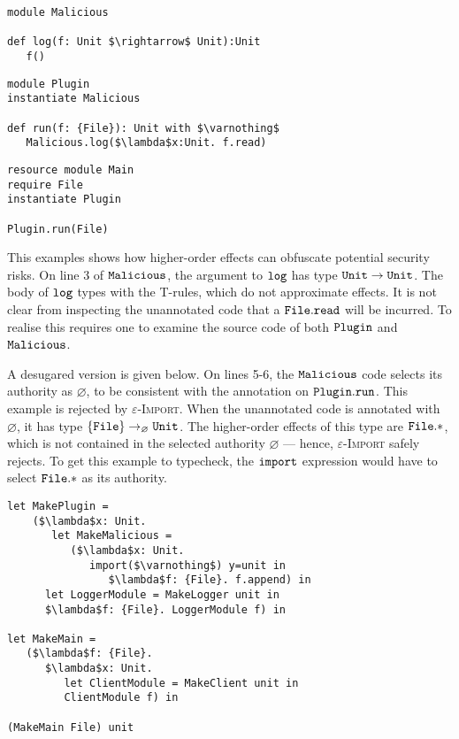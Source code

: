 \begin{lstlisting}
module Malicious

def log(f: Unit $\rightarrow$ Unit):Unit
   f()
\end{lstlisting}

\begin{lstlisting}
module Plugin
instantiate Malicious

def run(f: {File}): Unit with $\varnothing$
   Malicious.log($\lambda$x:Unit. f.read)
\end{lstlisting}

\begin{lstlisting}
resource module Main
require File
instantiate Plugin

Plugin.run(File)
\end{lstlisting}

This examples shows how higher-order effects can obfuscate potential security risks. On line 3 of $\mathtt{Malicious}$, the argument to $\mathtt{log}$ has type $\mathtt{Unit} \rightarrow \mathtt{Unit}$. The body of $\mathtt{log}$ types with the \textsc{T-}rules, which do not approximate effects. It is not clear from inspecting the unannotated code that a $\mathtt{File.read}$ will be incurred. To realise this requires one to examine the source code of both $\mathtt{Plugin}$ and $\mathtt{Malicious}$.

A desugared version is given below. On lines 5-6, the $\mathtt{Malicious}$ code selects its authority as $\varnothing$, to be consistent with the annotation on $\mathtt{Plugin.run}$. This example is rejected by \textsc{$\varepsilon$-Import}. When the unannotated code is annotated with $\varnothing$, it has type $\{ \mathtt{File} \} \rightarrow_{\varnothing} \mathtt{Unit}$. The higher-order effects of this type are $\mathtt{File.*}$, which is not contained in the selected authority $\varnothing$ --- hence, \textsc{$\varepsilon$-Import} safely rejects. To get this example to typecheck, the $\mathtt{import}$ expression would have to select $\mathtt{File.*}$ as its authority. 

\begin{lstlisting}
let MakePlugin =
	($\lambda$x: Unit.
	   let MakeMalicious =
	      ($\lambda$x: Unit.
	         import($\varnothing$) y=unit in
	            $\lambda$f: {File}. f.append) in
      let LoggerModule = MakeLogger unit in
      $\lambda$f: {File}. LoggerModule f) in

let MakeMain =
   ($\lambda$f: {File}.
      $\lambda$x: Unit.
         let ClientModule = MakeClient unit in
         ClientModule f) in

(MakeMain File) unit
\end{lstlisting}





























